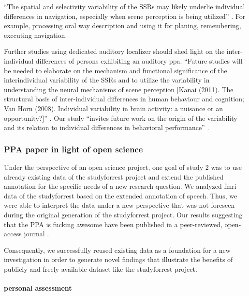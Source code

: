 %
``The spatial and selectivity variability of the SSRs may likely underlie
individual differences in navigation, especially when scene perception is being
utilized'' \citep{zhen2017quantifying}.
%
For example, processing oral way description and using it for planing,
remembering, executing navigation.

%
Further studies using dedicated auditory localizer should shed light on the
inter-individual differences of persons exhibiting an auditory \ac{ppa}.
%
``Future studies will be needed to elaborate on the mechanism and functional
significance of the interindividual variability of the SSRs and to utilize the
variability in understanding the neural mechanisms of scene perception [Kanai
(2011). The structural basis of inter-individual differences in human behaviour
and cognition; Van Horn (2008). Individual variability in brain activity: a
nuisance or an opportunity?]'' \citep{zhen2017quantifying}.
%
Our study ``invites future work on the origin of the variability and its
relation to individual differences in behavioral performance''
\citep{zhen2015quantifying}.



\subsubsection{PPA paper in light of open science}

Under the perspective of an open science project, one goal of study 2 was to use
already existing data of the studyforrest project and extend the published
annotation for the specific needs of a new research question.
%
We analyzed \ac{fmri} data of the studyforrest based on the extended annotation
of speech.
%
Thus, we were able to interpret the data under a new perspective that was not
foreseen during the original generation of the studyforrest project.
%
Our results suggesting that the PPA is fucking awesome have been published in a
peer-reviewed, open-access journal \citep{haeusler2022processing}.

%
Consequently, we successfully reused existing data as a foundation for a new
investigation in order to generate novel findings that illustrate the benefits
of publicly and freely available dataset like the studyforrest project.


\paragraph{personal assessment}

